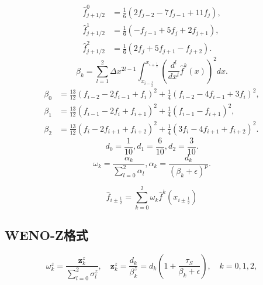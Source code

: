 \documentclass{article}
\numberwithin{equation}{section}    %
\begin{document}
\begin{subequations}
    \begin{align}
        \hat{f}_{j+1/2}^0 &= \frac{1}{6}(2f_{j-2} - 7f_{j-1} + 11f_j),\\
        \hat{f}_{j+1/2}^1 &= \frac{1}{6}(-f_{j-1} + 5f_j + 2f_{j+1}),\\
        \hat{f}_{j+1/2}^2 &= \frac{1}{6}(2f_j + 5f_{j+1} - f_{j+2}).
    \end{align}
\end{subequations}
\begin{equation}
    \beta_k = \sum_{l=1}^2 \Delta x^{2l-1} \int_{x_{i-\frac{1}{2}}}^{x_{i+\frac{1}{2}}} \left( \frac{d^l}{dx^l} \hat{f}^k(x) \right)^2 dx.
\end{equation}
\begin{subequations}
    \begin{align}
    \beta_0 &= \frac{13}{12} (f_{i-2} - 2f_{i-1} + f_i)^2 + \frac{1}{4} (f_{i-2} - 4f_{i-1} + 3f_i)^2,\\
    \beta_1 &= \frac{13}{12} (f_{i-1} - 2f_i + f_{i+1})^2 + \frac{1}{4} (f_{i-1} - f_{i+1})^2,\\
    \beta_2 &= \frac{13}{12} (f_i - 2f_{i+1} + f_{i+2})^2 + \frac{1}{4} (3f_i - 4f_{i+1} + f_{i+2})^2.
    \end{align}
\end{subequations}
\begin{equation}
    d_0 = \frac{1}{10}, d_1 = \frac{6}{10}, d_2 = \frac{3}{10}.
\end{equation}
\begin{equation}
    \omega_k = \frac{\alpha_k}{\sum_{l=0}^2 \alpha_l}, \alpha_k = \frac{d_k}{(\beta_k + \epsilon)^p}. 
\end{equation}


\begin{equation}
    \hat{f}_{i\pm\frac{1}{2}} =\sum_{k=0}^2 \omega_k \hat{f}^k(x_{i\pm\frac{1}{2}})
\end{equation}



\subsection{WENO-Z格式}
\begin{equation}
    \omega_k^z = \frac{\mathbf{z}_k^z}{\sum_{l=0}^2\sigma_l^z}, \quad \mathbf{z}_k^z = \frac{d_k}{\beta_k^z} = d_k \left(1 + \frac{\tau_S}{\beta_k + \epsilon}\right), \quad k = 0,1,2,
\end{equation}
\end{document}
